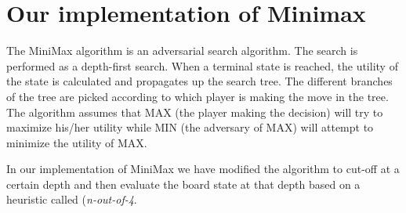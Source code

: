 \section{Our implementation of Minimax}
\label{Our_Version}
The MiniMax algorithm is an adversarial search algorithm. The search is performed as a depth-first search. When a terminal state is reached, the utility of the state is calculated and propagates up the search tree. The different branches of the tree are picked according to which player is making the move in the tree. The algorithm assumes that MAX (the player making the decision) will try to maximize his/her utility while MIN (the adversary of MAX) will attempt to minimize the utility of MAX.

In our implementation of MiniMax we have modified the algorithm to cut-off at a certain depth and then evaluate the board state at that depth based on a heuristic called (\textit{n-out-of-4}.